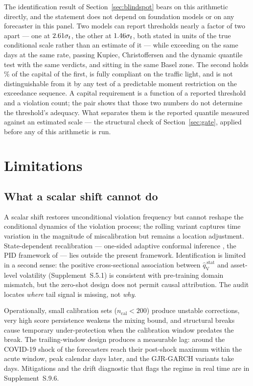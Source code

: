 \documentclass[preprint,11pt,authoryear]{elsarticle}
\newcommand{\1}{\boldsymbol{1}}
\newcommand{\qVstat}{\hat{q}_{\scriptscriptstyle\mathrm{V}}^{\,\mathrm{stat}}}
\begin{document}
The identification result of Section~\ref{sec:blindspot} bears on this
arithmetic directly, and the statement does not depend on foundation models or on
any forecaster in this panel. Two models can report thresholds nearly a factor of
two apart --- one at $2.61\sigma_t$, the other at
$1.46\sigma_t$, both stated in units of the true conditional scale
rather than an estimate of it --- while exceeding on
the same days at the same rate, passing Kupiec, Christoffersen and
the dynamic quantile test with the same verdicts, and sitting in the same Basel
zone. The second holds \nPairCapitalPct\% of the capital of the first, is fully compliant
on the traffic light, and is not distinguishable from it by any test of a
predictable moment restriction on the exceedance sequence. A capital requirement
is a function of a reported threshold and a violation count; the pair shows that
those two numbers do not determine the threshold's adequacy. What separates them
is the reported quantile measured against an estimated scale --- the structural
check of Section~\ref{sec:gate}, applied before any of this arithmetic is run.

\section{Limitations}
\label{sec:discuss}
\label{sec:failure}

\subsection{What a scalar shift cannot do}

A scalar shift restores unconditional violation frequency but cannot reshape the
conditional dynamics of the violation process; the rolling variant captures time
variation in the magnitude of miscalibration but remains a location adjustment.
State-dependent recalibration --- one-sided adaptive conformal inference
\citep{gibbs2021adaptive}, the PID framework of \citet{angelopoulos2024pid} ---
lies outside the present framework. Identification is limited in a second sense:
the positive cross-sectional association between $\qVstat$ and asset-level
volatility (Supplement~S.5.1) is consistent with pre-training domain mismatch,
but the zero-shot design does not permit causal attribution. The audit locates
\emph{where} tail signal is missing, not \emph{why}.

Operationally, small calibration sets ($n_{\mathrm{cal}} < 200$) produce unstable
corrections, very high score persistence weakens the mixing bound, and structural
breaks cause temporary under-protection when the calibration window predates the
break. The trailing-window design produces a measurable lag: around the COVID-19
shock \nLagImmediate{} of the \nLagForecasters{} forecasters reach their
post-shock maximum within the acute window, \nLagMidN{} peak \nLagMidDays{}
calendar days later, and the \nLagLateN{} GJR-GARCH variants take
\nLagLateDays{} days. Mitigations and the drift diagnostic that flags the regime in real
time are in Supplement~S.9.6.
\end{document}
